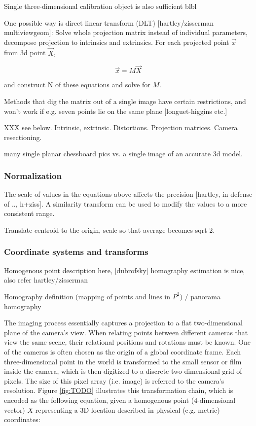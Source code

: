 Single three-dimensional calibration object is also sufficient blbl

One possible way is direct linear transform (DLT) [hartley/zisserman multiviewgeom]: Solve whole projection matrix instead of individual parameters, decompose projection to intrinsics and extrinsics. For each projected point $\vec x$ from 3d point $\vec X$,

\[
	\vec x = M \vec X
\]

and construct N of these equations and solve for $M$.

Methods that dig the matrix out of a single image have certain restrictions, and won't work if e.g. seven points lie on the same plane [longuet-higgins etc.]

XXX see below. Intrinsic, extrinsic. Distortions. Projection matrices. Camera resectioning.

many single planar chessboard pics vs. a single image of an accurate 3d model.

\subsubsection{Normalization}

The scale of values in the equations above affects the precision [hartley, in defense of .., h+ziss]. A similarity transform can be used to modify the values to a more consistent range.

Translate centroid to the origin, scale so that average becomes sqrt 2.


\subsubsection{Coordinate systems and transforms}

Homogenous point description here, [dubrofsky] homography estimation is nice, also refer hartley/zisserman

Homography definition (mapping of points and lines in $P^2$) / panorama homography

The imaging process essentially captures a projection to a flat two-dimensional plane of the camera's view.
When relating points between different cameras that view the same scene, their relational positions and rotations must be known.
One of the cameras is often chosen as the origin of a global coordinate frame.
Each three-dimensional point in the world is transformed to the small sensor or film inside the camera, which is then digitized to a discrete two-dimensional grid of pixels. The size of this pixel array (i.e. image) is referred to the camera's resolution.
Figure \ref{fig:TODO} illustrates this transformation chain, which is encoded as the following equation, given a homogenous point (4-dimensional vector) $X$ representing a 3D location described in physical (e.g. metric) coordinates:

